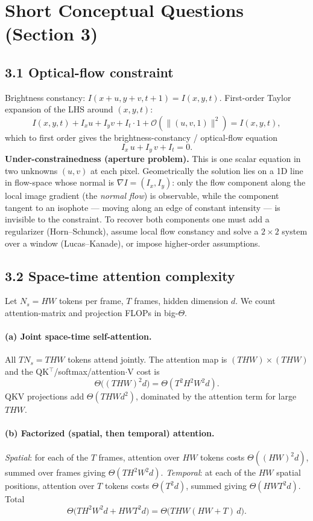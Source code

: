 \documentclass[10pt,a4paper]{article}
\begin{document}
\section{Short Conceptual Questions (Section 3)}

\subsection*{3.1 Optical-flow constraint}
Brightness constancy: $I(x+u,y+v,t+1)=I(x,y,t)$. First-order Taylor expansion of the LHS around $(x,y,t)$:
\[
    I(x,y,t) + I_x u + I_y v + I_t \cdot 1 + \mathcal{O}(\|(u,v,1)\|^2) = I(x,y,t),
\]
which to first order gives the brightness-constancy / optical-flow equation
\[
    \boxed{\,I_x\,u + I_y\,v + I_t = 0.\,}
\]
\textbf{Under-constrainedness (aperture problem).} This is one scalar equation in two unknowns $(u,v)$ at each pixel. Geometrically the solution lies on a 1D line in flow-space whose normal is $\nabla I=(I_x,I_y)$: only the flow component along the local image gradient (the \emph{normal flow}) is observable, while the component tangent to an isophote --- moving along an edge of constant intensity --- is invisible to the constraint. To recover both components one must add a regularizer (Horn--Schunck), assume local flow constancy and solve a $2\times 2$ system over a window (Lucas--Kanade), or impose higher-order assumptions.

\subsection*{3.2 Space-time attention complexity}
Let $N_s = HW$ tokens per frame, $T$ frames, hidden dimension $d$. We count attention-matrix and projection FLOPs in big-$\Theta$.

\paragraph{(a) Joint space-time self-attention.} All $TN_s = THW$ tokens attend jointly. The attention map is $(THW)\times(THW)$ and the QK$^\top$/softmax/attention$\cdot$V cost is
\[
    \Theta\bigl((THW)^2 d\bigr) = \Theta(T^2 H^2 W^2 d).
\]
QKV projections add $\Theta(THW d^2)$, dominated by the attention term for large $THW$.

\paragraph{(b) Factorized (spatial, then temporal) attention.}
\emph{Spatial}: for each of the $T$ frames, attention over $HW$ tokens costs $\Theta((HW)^2 d)$, summed over frames giving $\Theta(T H^2 W^2 d)$. \emph{Temporal}: at each of the $HW$ spatial positions, attention over $T$ tokens costs $\Theta(T^2 d)$, summed giving $\Theta(HW T^2 d)$. Total
\[
    \Theta\bigl(T H^2 W^2 d + HW T^2 d\bigr) = \Theta\bigl(THW(HW + T)\,d\bigr).
\]
\end{document}
